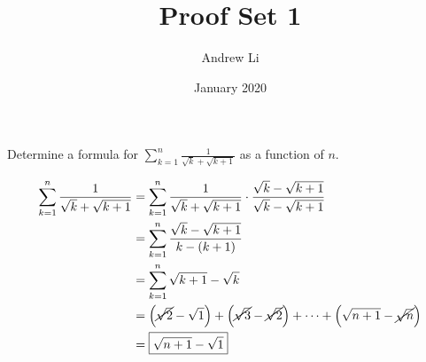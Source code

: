 \documentclass{homework}
\title{Proof Set 1}
\author{Andrew Li}
\date{January 2020}
\begin{document}
  \maketitle

  \begin{problem}
    Determine a formula for $\displaystyle\sum_{k=1}^n \frac{1}{\sqrt{k}+\sqrt{k+1}}$ as a function of $n$.
    
    \solution
    \begin{align*}
      \sum_{k=1}^n \frac{1}{\sqrt{k}+\sqrt{k+1}} &= \sum_{k=1}^n \frac{1}{\sqrt{k}+\sqrt{k+1}} \cdot \frac{\sqrt{k}-\sqrt{k+1}}{\sqrt{k}-\sqrt{k+1}} \\
      &= \sum_{k=1}^n \frac{\sqrt{k}-\sqrt{k+1}}{k-(k+1)} \\
      &= \sum_{k=1}^n \sqrt{k+1}-\sqrt{k} \\
      &= \left(\cancel{\sqrt{2}}-\sqrt{1}\right) + \left(\cancel{\sqrt{3}}-\cancel{\sqrt{2}}\right) + \cdots + \left(\sqrt{n+1}-\cancel{\sqrt{n}}\right) \\
      &= \boxed{\sqrt{n+1}-\sqrt{1}}
    \end{align*}
  \end{problem}
\end{document}
